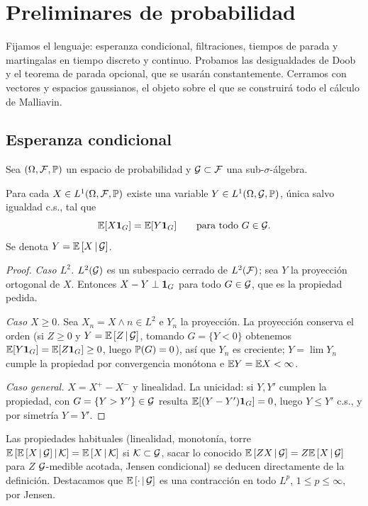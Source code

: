\chapter{Preliminares de probabilidad}\label{cap:preliminares}

\begin{panorama}
Fijamos el lenguaje: esperanza condicional, filtraciones, tiempos de parada y martingalas
en tiempo discreto y continuo. Probamos las desigualdades de Doob y el teorema de parada
opcional, que se usarán constantemente. Cerramos con vectores y espacios gaussianos, el
objeto sobre el que se construirá todo el cálculo de Malliavin.
\end{panorama}

\section{Esperanza condicional}
Sea $(\Omega,\F,\P)$ un espacio de probabilidad y $\G\subset\F$ una sub-$\sigma$-álgebra.

\begin{teorema}\label{teo:esp-cond}
Para cada $X\in L^1(\Omega,\F,\P)$ existe una variable
$Y\in L^1(\Omega,\G,\P)$, única salvo igualdad c.s., tal que
\[
  \E[X\ind_G]=\E[Y\ind_G]\qquad\text{para todo } G\in\G.
\]
Se denota $Y=\cond{X}{\G}$.
\end{teorema}

\begin{proof}
\emph{Caso $L^2$.} $L^2(\G)$ es un subespacio cerrado de $L^2(\F)$; sea $Y$ la proyección ortogonal
de $X$. Entonces $X-Y\perp\ind_G$ para todo $G\in\G$, que es la propiedad pedida.

\emph{Caso $X\ge0$.} Sea $X_n=X\wedge n\in L^2$ e $Y_n$ la proyección. La proyección conserva el orden
(si $Z\ge0$ y $Y=\cond{Z}{\G}$, tomando $G=\{Y<0\}$ obtenemos $\E[Y\ind_G]=\E[Z\ind_G]\ge0$, luego
$\P(G)=0$), así que $Y_n$ es creciente; $Y=\lim Y_n$ cumple la propiedad por convergencia monótona
e $\E Y=\E X<\infty$.

\emph{Caso general.} $X=X^+-X^-$ y linealidad. La unicidad: si $Y,Y'$ cumplen la propiedad, con
$G=\{Y>Y'\}\in\G$ resulta $\E[(Y-Y')\ind_G]=0$, luego $Y\le Y'$ c.s., y por simetría $Y=Y'$.
\end{proof}

Las propiedades habituales (linealidad, monotonía, torre $\cond{\cond{X}{\G}}{\mathcal K}=\cond{X}{\mathcal K}$ si $\mathcal K\subset\G$,
sacar lo conocido $\cond{ZX}{\G}=Z\cond{X}{\G}$ para $Z$ $\G$-medible acotada, Jensen condicional) se
deducen directamente de la definición. Destacamos que $\cond{\cdot}{\G}$ es una contracción en todo $L^p$,
$1\le p\le\infty$, por Jensen.


